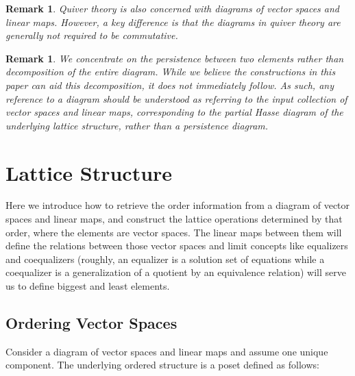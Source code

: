 \documentclass[10pt]{amsart}
\newtheorem{remark}[theorem]{Remark}
\begin{document}
\begin{remark}
Quiver theory is also concerned with diagrams of vector spaces and
linear maps. However, a key difference is that the diagrams in quiver
theory are generally not required to be commutative. 
\end{remark}

\begin{remark}
We concentrate on the persistence between two elements rather than decomposition of the entire diagram. 
While we believe the constructions in this paper can aid this
decomposition, it does not immediately follow. As such, any reference
to a diagram should be understood as referring to the input collection
of vector spaces and linear maps, corresponding to the partial Hasse diagram of the underlying lattice structure, 
rather than a persistence diagram.
\end{remark}







%
\section{Lattice Structure}
\label{Structural Theory}


Here we introduce how to retrieve the order information from a diagram of vector spaces and linear maps, and construct the lattice operations determined by that order, where the elements are vector spaces. 
The linear maps between them will define the relations between those vector spaces and limit concepts like equalizers and coequalizers (roughly, an equalizer is a solution set of equations while a coequalizer is a generalization of a quotient by an equivalence relation) will serve us to define biggest and least elements.   

\subsection{Ordering Vector Spaces}


Consider a diagram of vector spaces and linear maps and assume one unique component.
The underlying ordered structure is a poset defined as follows: 
\end{document}
